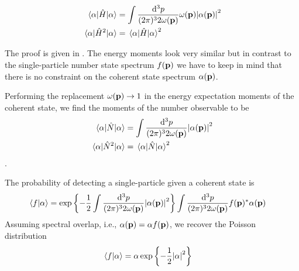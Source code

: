 \begin{lemma}\label{thm:coherent_state_energy_observable}
	\begin{align}
		\expval{\hat{H}}{\alpha}
		&=
		\int\frac{\dd[3]{p}}{(2\pi)^32\omega(\vb{p})}
		\omega(\vb{p})
		\abs{\alpha(\vb{p})}^2
		\\
		\expval{\hat{H}^2}{\alpha}
		&=
		\expval{\hat{H}}{\alpha}^2
	\end{align}	
\end{lemma}
The proof is given in .
The energy moments look very similar but in contrast to the single-particle number state spectrum $f(\vb{p})$ we have to keep in mind that there is no constraint on the coherent state spectrum $\alpha(\vb{p})$.
\begin{corollary}
	Performing the replacement $\omega(\vb{p})\to1$ in the energy expectation moments of the coherent state, we find the moments of the number observable to be
	\begin{align}
		\expval{\hat{N}}{\alpha}
		&=
		\int\frac{\dd[3]{p}}{(2\pi)^32\omega(\vb{p})}
		\abs{\alpha(\vb{p})}^2
		\\
		\expval{\hat{N}^2}{\alpha}
		&=
		\expval{\hat{N}}{\alpha}^2
	\end{align}
	.
\end{corollary}

\begin{lemma}
	The probability of detecting a single-particle given a coherent state is
	\begin{equation}
		\begin{split}
			\braket{f}{\alpha}
			&=
			\exp\left\{
				-
				\frac{1}{2}
				\int\frac{\dd[3]{p}}{(2\pi)^32\omega(\vb{p})}
				\abs{\alpha(\vb{p})}^2
			\right\}
			\int\frac{\dd[3]{p}}{(2\pi)^32\omega(\vb{p})}
			f(\vb{p})^*
			\alpha(\vb{p})
		\end{split}
	\end{equation}
	Assuming spectral overlap, i.e., $\alpha(\vb{p})=\alpha f(\vb{p})$, we recover the Poisson distribution
	\begin{equation}
		\begin{split}
			\braket{f}{\alpha}
			&=
			\alpha
			\exp\left\{
				-
				\frac{1}{2}
				\abs{\alpha}^2
			\right\}
		\end{split}
	\end{equation}
\end{lemma}
